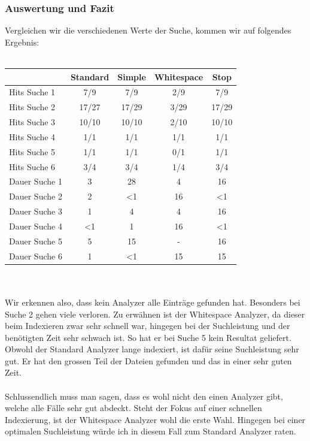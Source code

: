 \documentclass[12pt,a4paper,ngerman]{report}
\begin{document}
\subsubsection{Auswertung und Fazit}
Vergleichen wir die verschiedenen Werte der Suche, kommen wir auf folgendes Ergebnis: \\ \\
\begin{tabular}{|l|c|c|c|c|} \hline
 & \textbf{Standard} & \textbf{Simple} & \textbf{Whitespace} & \textbf{Stop} \\ \hline
Hits Suche 1 & 7/9 & 7/9 & 2/9 & 7/9\\
Hits Suche 2 & 17/27 & 17/29 & 3/29 & 17/29\\
Hits Suche 3 & 10/10 & 10/10 & 2/10 & 10/10\\
Hits Suche 4 & 1/1 & 1/1 & 1/1 & 1/1\\
Hits Suche 5 & 1/1 & 1/1 & 0/1 & 1/1\\
Hits Suche 6 & 3/4 & 3/4& 1/4 & 3/4\\ \hline
Dauer Suche 1 & 3 & 28 & 4 & 16\\
Dauer Suche 2 & 2 & \textless 1 & 16 & \textless 1\\
Dauer Suche 3 & 1 & 4 & 4 & 16\\
Dauer Suche 4 & \textless 1 & 1 & 16 & \textless 1\\
Dauer Suche 5 & 5 & 15 & - & 16\\
Dauer Suche 6 & 1 & \textless 1 & 15 & 15\\ \hline
\end{tabular} \\ \\
Wir erkennen also, dass kein Analyzer alle Einträge gefunden hat. Besonders bei Suche 2 gehen viele verloren. Zu erwähnen ist der Whitespace Analyzer, da dieser beim Indexieren zwar sehr schnell war, hingegen bei der Suchleistung und der benötigten Zeit sehr schwach ist. So hat er bei Suche 5 kein Resultat geliefert. Obwohl der Standard Analyzer lange indexiert, ist dafür seine Suchleistung sehr gut. Er hat den grossen Teil der Dateien gefunden und das in einer sehr guten Zeit.\\
\\
Schlussendlich muss man sagen, dass es wohl nicht den einen Analyzer gibt, welche alle Fälle sehr gut abdeckt. Steht der Fokus auf einer schnellen Indexierung, ist der Whitespace Analyzer wohl die erste Wahl. Hingegen bei einer optimalen Suchleistung würde ich in diesem Fall zum Standard Analyzer raten.
\newpage
\end{document}
